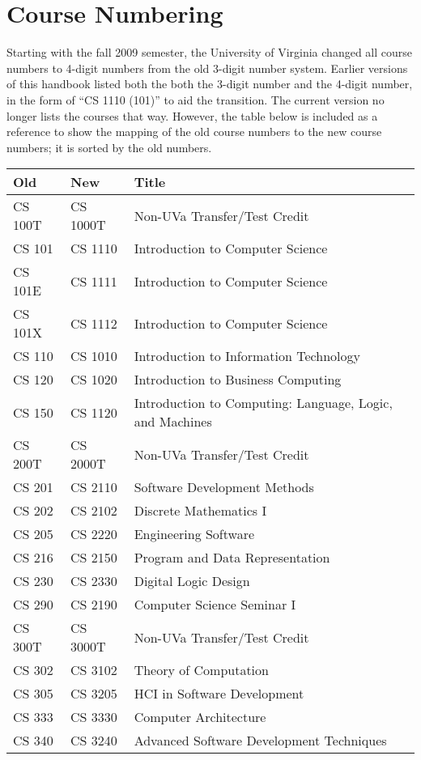 \documentclass[10pt,letter]{book}
\newcommand{\mysection}[1]{\section{#1}\renewcommand{\rightmark}{#1}}
\begin{document}
\mysection{Course Numbering}
\label{course-numbering}

Starting with the fall 2009 semester, the University of Virginia
changed all course numbers to 4-digit numbers from the old 3-digit
number system. Earlier versions of this handbook listed both the both
the 3-digit number and the 4-digit number, in the form of ``CS
1110 (101)'' to aid the transition.  The current version no longer
lists the courses that way.  However, the table below is included as a
reference to show the mapping of the old course numbers to the new
course numbers; it is sorted by the old numbers.

\begin{table}
\begin{tabular}{llp{2.5in}} \hline
\bf Old & \bf New & \bf Title \\ \hline
CS 100T & CS 1000T & Non-UVa Transfer/Test Credit \\
CS 101 & CS 1110 & Introduction to Computer Science \\
CS 101E & CS 1111 & Introduction to Computer Science \\
CS 101X & CS 1112 & Introduction to Computer Science \\
CS 110 & CS 1010 & Introduction to Information Technology \\
CS 120 & CS 1020 & Introduction to Business Computing \\
CS 150 & CS 1120 & Introduction to Computing: Language, Logic, and
Machines \\
CS 200T & CS 2000T & Non-UVa Transfer/Test Credit \\
CS 201 & CS 2110 & Software Development Methods \\
CS 202 & CS 2102 & Discrete Mathematics I \\
CS 205 & CS 2220 & Engineering Software \\
CS 216 & CS 2150 & Program and Data Representation \\
CS 230 & CS 2330 & Digital Logic Design \\
CS 290 & CS 2190 & Computer Science Seminar I \\
CS 300T & CS 3000T & Non-UVa Transfer/Test Credit \\
CS 302 & CS 3102 & Theory of Computation \\
CS 305 & CS 3205 & HCI in Software Development \\
CS 333 & CS 3330 & Computer Architecture \\
CS 340 & CS 3240 & Advanced Software Development Techniques \\

\end{tabular}
\end{table}
\end{document}
